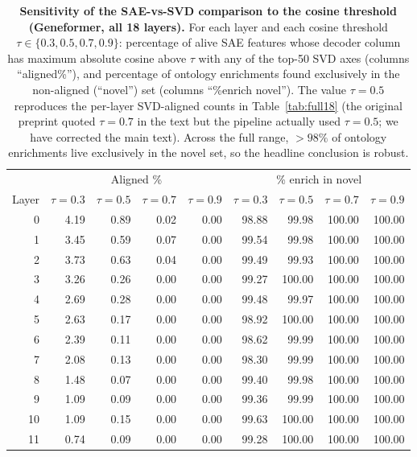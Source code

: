 \documentclass[onecolumn]{article}
\begin{document}
\begin{table}[H]
\centering
\caption{\textbf{Sensitivity of the SAE-vs-SVD comparison to the cosine threshold (Geneformer, all 18 layers).} For each layer and each cosine threshold $\tau \in \{0.3, 0.5, 0.7, 0.9\}$: percentage of alive SAE features whose decoder column has maximum absolute cosine above $\tau$ with any of the top-50 SVD axes (columns ``aligned\%''), and percentage of ontology enrichments found exclusively in the non-aligned (``novel'') set (columns ``\%enrich novel''). The value $\tau{=}0.5$ reproduces the per-layer SVD-aligned counts in Table~\ref{tab:full18} (the original preprint quoted $\tau{=}0.7$ in the text but the pipeline actually used $\tau{=}0.5$; we have corrected the main text). Across the full range, $>98\%$ of ontology enrichments live exclusively in the novel set, so the headline conclusion is robust.}
\label{tab:svd_sweep}
\smallskip
\small
\begin{tabular}{r|rrrr|rrrr}
\toprule
& \multicolumn{4}{c|}{Aligned \%} & \multicolumn{4}{c}{\% enrich in novel} \\
Layer & $\tau{=}0.3$ & $\tau{=}0.5$ & $\tau{=}0.7$ & $\tau{=}0.9$ & $\tau{=}0.3$ & $\tau{=}0.5$ & $\tau{=}0.7$ & $\tau{=}0.9$ \\
\midrule
0  & 4.19 & 0.89 & 0.02 & 0.00 & 98.88 & 99.98 & 100.00 & 100.00 \\
1  & 3.45 & 0.59 & 0.07 & 0.00 & 99.54 & 99.98 & 100.00 & 100.00 \\
2  & 3.73 & 0.63 & 0.04 & 0.00 & 99.49 & 99.93 & 100.00 & 100.00 \\
3  & 3.26 & 0.26 & 0.00 & 0.00 & 99.27 & 100.00 & 100.00 & 100.00 \\
4  & 2.69 & 0.28 & 0.00 & 0.00 & 99.48 & 99.97 & 100.00 & 100.00 \\
5  & 2.63 & 0.17 & 0.00 & 0.00 & 98.92 & 100.00 & 100.00 & 100.00 \\
6  & 2.39 & 0.11 & 0.00 & 0.00 & 98.62 & 99.99 & 100.00 & 100.00 \\
7  & 2.08 & 0.13 & 0.00 & 0.00 & 98.30 & 99.99 & 100.00 & 100.00 \\
8  & 1.48 & 0.07 & 0.00 & 0.00 & 99.40 & 99.98 & 100.00 & 100.00 \\
9  & 1.09 & 0.09 & 0.00 & 0.00 & 99.36 & 99.99 & 100.00 & 100.00 \\
10 & 1.09 & 0.15 & 0.00 & 0.00 & 99.63 & 100.00 & 100.00 & 100.00 \\
11 & 0.74 & 0.09 & 0.00 & 0.00 & 99.28 & 100.00 & 100.00 & 100.00 \\

\end{tabular}
\end{table}
\end{document}
